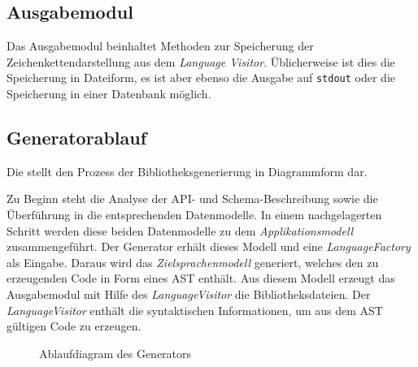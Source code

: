 \subsection{Ausgabemodul}
\label{sec:printer_module}

Das Ausgabemodul beinhaltet Methoden zur Speicherung der Zeichenkettendarstellung aus dem \emph{Language Visitor}. Üblicherweise ist dies die Speicherung in Dateiform, es ist aber ebenso die Ausgabe auf \texttt{stdout} oder die Speicherung in einer Datenbank möglich.

\subsection{Generatorablauf}
\label{sec:generation_process}

Die  stellt den Prozess der Bibliotheksgenerierung in Diagrammform dar.

Zu Beginn steht die Analyse der \gls{API}- und Schema-Beschreibung sowie die Überführung in die entsprechenden Datenmodelle. In einem nachgelagerten Schritt werden diese beiden Datenmodelle zu dem \emph{Applikationsmodell} zusammengeführt. Der Generator erhält dieses Modell und eine \emph{LanguageFactory} als Eingabe. Daraus wird das \emph{Zielsprachenmodell} generiert, welches den zu erzeugenden Code in Form eines \gls{AST} enthält. Aus diesem Modell erzeugt das Ausgabemodul mit Hilfe des \emph{LanguageVisitor} die Bibliotheksdateien. Der \emph{LanguageVisitor} enthält die syntaktischen Informationen, um aus dem \gls{AST} gültigen Code zu erzeugen.

\begin{sidewaysfigure}
    \centering
    \resizebox{ \textwidth}{!}{
        
    } 
    \caption{Ablaufdiagram des Generators}
    \label{fig:generation_process}
\end{sidewaysfigure}
